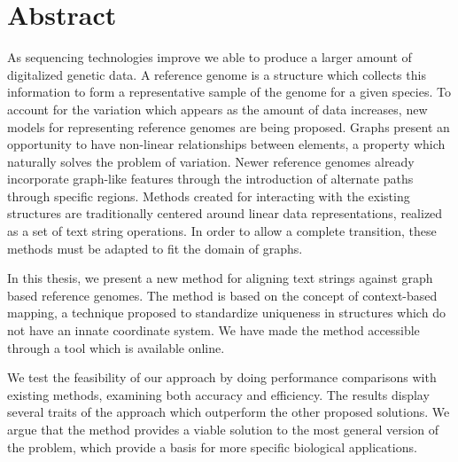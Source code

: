 \documentclass[thesis.tex]{subfiles}
\begin{document}
\chapter*{Abstract}
As sequencing technologies improve we able to produce a larger amount of digitalized genetic data. A reference genome is a structure which collects this information to form a representative sample of the genome for a given species. To account for the variation which appears as the amount of data increases, new models for representing reference genomes are being proposed. Graphs present an opportunity to have non-linear relationships between elements, a property which naturally solves the problem of variation. Newer reference genomes already incorporate graph-like features through the introduction of alternate paths through specific regions. Methods created for interacting with the existing structures are traditionally centered around linear data representations, realized as a set of text string operations. In order to allow a complete transition, these methods must be adapted to fit the domain of graphs. \\
\par\noindent
In this thesis, we present a new method for aligning text strings against graph based reference genomes. The method is based on the concept of context-based mapping, a technique proposed to standardize uniqueness in structures which do not have an innate coordinate system. We have made the method accessible through a tool which is available online.\\
\par\noindent
We test the feasibility of our approach by doing performance comparisons with existing methods, examining both accuracy and efficiency. The results display several traits of the approach which outperform the other proposed solutions. We argue that the method provides a viable solution to the most general version of the problem, which provide a basis for more specific biological applications.\\
\end{document}
